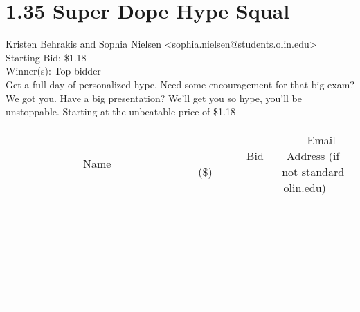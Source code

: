 \documentclass[11pt]{article}
\begin{document}
					\section*{1.35 Super Dope Hype Squal}
					Kristen Behrakis and Sophia Nielsen <sophia.nielsen@students.olin.edu> \\
					Starting Bid: \$1.18 \\
					Winner(s): Top bidder \\
					Get a full day of personalized hype. Need some encouragement for that big exam? We got you. Have a big presentation? We’ll get you so hype, you’ll be unstoppable. Starting at the unbeatable price of \$1.18 \\
					[6ex]
					\begin{tabular}{c c c}
						~~~~~~~~~~~~~Name~~~~~~~~~~~~~ & ~~~~~~~~~Bid (\$)~~~~~~~~~ & ~~~Email Address (if not standard olin.edu)~~~ \\
				
 & & \\
\hline
 & & \\
\hline
 & & \\
\hline
 & & \\
\hline
 & & \\
\hline
 & & \\
\hline
 & & \\
\hline
 & & \\
\hline
 & & \\
\hline
 & & \\
\hline
 & & \\
\hline
 & & \\
\hline
 & & \\
\hline
 & & \\
\hline
 & & \\
\hline
 & & \\
\hline
 & & \\
\hline
 & & \\
\hline
 & & \\
\hline
 & & \\
\hline
 & & \\
\hline
 & & \\
\hline
 & & \\
\hline
 & & \\
\hline
 & & \\
\hline
 & & \\
\hline
					\end{tabular}
					\clearpage
				
\end{document}
